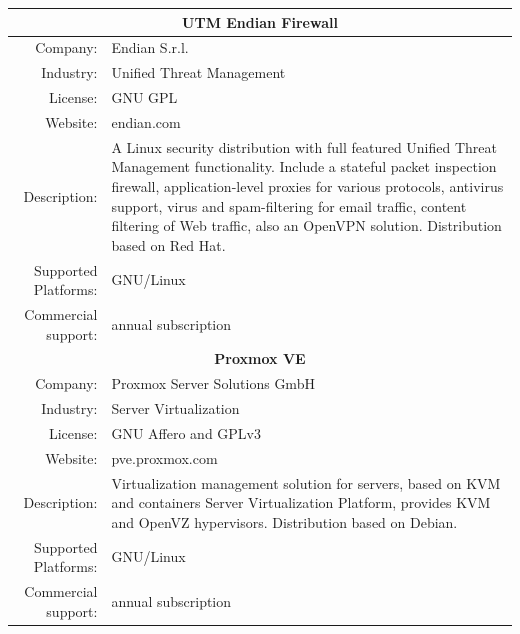 \documentclass[a4paper, 12pt]{book}
\begin{document}
\begin{table}
  \centering
  \begin{tabular}{ | r m{10cm} | }
  
    \hline    
    \multicolumn{2}{|c|}{\textbf{UTM Endian Firewall}}\\
    \hline
    Company: & Endian S.r.l. \\
    Industry: & Unified Threat Management \\
    License: & GNU GPL \\
    Website: & endian.com \\
    Description: & A Linux security distribution with full featured Unified Threat Management functionality. Include a stateful packet inspection firewall, application-level proxies for various protocols, antivirus support, virus and spam-filtering for email traffic, content filtering of Web traffic, also an OpenVPN solution. Distribution based on Red Hat. \\
    Supported Platforms: & GNU/Linux \\
    Commercial support: & annual subscription \\
    
    \hline
    \multicolumn{2}{|c|}{\textbf{Proxmox VE}}\\
    \hline
    Company: & Proxmox Server Solutions GmbH \\
    Industry: & Server Virtualization \\
    License: & GNU Affero and GPLv3 \\
    Website: & pve.proxmox.com \\
    Description: & Virtualization management solution for servers, based on KVM and containers Server Virtualization Platform, provides KVM and OpenVZ hypervisors. Distribution based on Debian. \\
    Supported Platforms: & GNU/Linux \\
    Commercial support: & annual subscription \\
    

\end{tabular}
\end{table}
\end{document}
